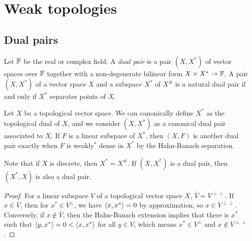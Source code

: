 \documentclass{../../large}
\begin{document}
\chapter{Weak topologies}
\section{Dual pairs}

\begin{prb}
Let $\mathbb{F}$ be the real or complex field.
A \emph{dual pair} is a pair $(X,X^*)$ of vector spaces over $\mathbb{F}$ together with a non-degenerate bilinear form $X\times X^*\to\mathbb{F}$.
A pair $(X,X^*)$ of a vector space $X$ and a subspace $X^*$ of $X^\#$ is a natural dual pair if and only if $X^*$ separates points of $X$.

Let $X$ be a topological vector space.
We can canonically define $X^*$ as the topological dual of $X$, and we consider $(X,X^*)$ as a canonical dual pair associated to $X$.
If $F$ is a linear subspace of $X^*$, then $(X,F)$ is another dual pair exactly when $F$ is weakly$^*$ dense in $X^*$ by the Hahn-Banach separation.

Note that if $X$ is discrete, then $X^*=X^\#$.
If $(X,X^*)$ is a dual pair, then $(X^*,X)$ is also a dual pair.
\end{prb}



\begin{proof}
For a linear subspace $V$ of a topological vector space $X$, $\bar V=V^{\perp\perp}$.
If $x\in\bar V$, then for $x^*\in V^\perp$, we have $\langle x,x^*\rangle=0$ by approximation, so $x\in V^{\perp\perp}$.
Conversely, if $x\notin\bar V$, then the Hahn-Banach extension implies that there is $x^*$ such that $\langle y,x^*\rangle=0<\langle x,x^*\rangle$ for all $y\in V$, which means $x^*\in V^\perp$ and $x\notin V^{\perp\perp}$.

\end{proof}
\end{document}
